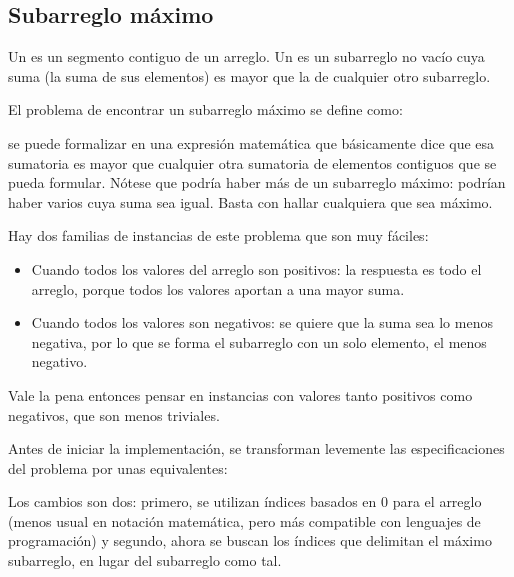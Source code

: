 \subsection{Subarreglo máximo}
\label{sec:subarreglo_max}

Un  es un segmento contiguo de un arreglo. Un  es un subarreglo no vacío cuya suma (la suma de sus elementos) es mayor que la de cualquier otro subarreglo.

El problema de encontrar un subarreglo máximo se define como:
\begin{especificacion}
\end{especificacion}
 se puede formalizar en una expresión matemática que básicamente dice que esa sumatoria es mayor que cualquier otra sumatoria de elementos contiguos que se pueda formular. Nótese que podría haber más de un subarreglo máximo: podrían haber varios cuya suma sea igual. Basta con hallar cualquiera que sea máximo.

Hay dos familias de instancias de este problema que son muy fáciles:
\begin{itemize}
  \item Cuando todos los valores del arreglo son positivos: la respuesta es todo el arreglo, porque todos los valores aportan a una mayor suma.
  \item Cuando todos los valores son negativos: se quiere que la suma sea lo menos negativa, por lo que se forma el subarreglo con un solo elemento, el menos negativo.
\end{itemize}
Vale la pena entonces pensar en instancias con valores tanto positivos como negativos, que son menos triviales.

Antes de iniciar la implementación, se transforman levemente las especificaciones del problema por unas equivalentes:
\begin{especificacion}
\end{especificacion}
Los cambios son dos: primero, se utilizan índices basados en 0 para el arreglo (menos usual en notación matemática, pero más compatible con lenguajes de programación) y segundo, ahora se buscan los índices que delimitan el máximo subarreglo, en lugar del subarreglo como tal.

